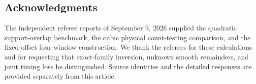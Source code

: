 \subsection*{Acknowledgments}
The independent referee reports of September 9, 2026 supplied the
quadratic support-overlap benchmark, the cubic physical count-testing
comparison, and the fixed-offset four-window construction. We thank the
referees for these calculations and for requesting that exact-family
inversion, unknown smooth remainders, and joint timing loss be
distinguished. Source identities and the detailed responses are
provided separately from this article.
\appendix





















